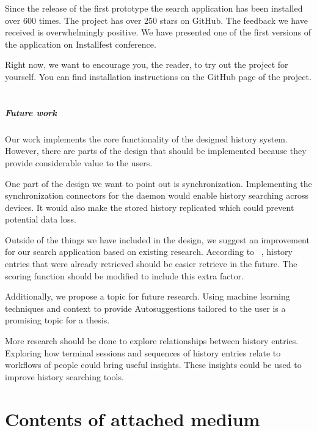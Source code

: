 \documentclass[thesis=M,english]{FITthesis}[2012/10/20]
\let\myCite\cite
\renewcommand\cite{\unskip~\myCite}
\begin{document}
\begin{conclusion}
Since the release of the first prototype the search application has been installed over 600 times. The project has over 250 stars on GitHub. The feedback we have received is overwhelmingly positive. We have presented one of the first versions of the application on Installfest conference. \cite{installfest-talk}\cite{installfest} 

Right now, we want to encourage you, the reader, to try out the project for yourself. You can find installation instructions on the GitHub page of the project. \cite{resh-github-homepage}


\paragraph{Future work}

Our work implements the core functionality of the designed history system. However, there are parts of the design that should be implemented because they provide considerable value to the users.

One part of the design we want to point out is synchronization.
Implementing the synchronization connectors for the daemon would enable history searching across devices. It would also make the stored history replicated which could prevent potential data loss.

Outside of the things we have included in the design, we suggest an improvement for our search application based on existing research. According to \cite{greenberg1993computer}, history entries that were already retrieved should be easier retrieve in the future. The scoring function should be modified to include this extra factor. 

Additionally, we propose a topic for future research. Using machine learning techniques and context to provide Autosuggestions tailored to the user is a promising topic for a thesis.   

More research should be done to explore relationships between history entries. Exploring how terminal sessions and sequences of history entries relate to workflows of people could bring useful insights. These insights could be used to improve history searching tools.

\end{conclusion}




\appendix


\chapter{Contents of attached medium}\label{app:SDcontent}
\end{document}
